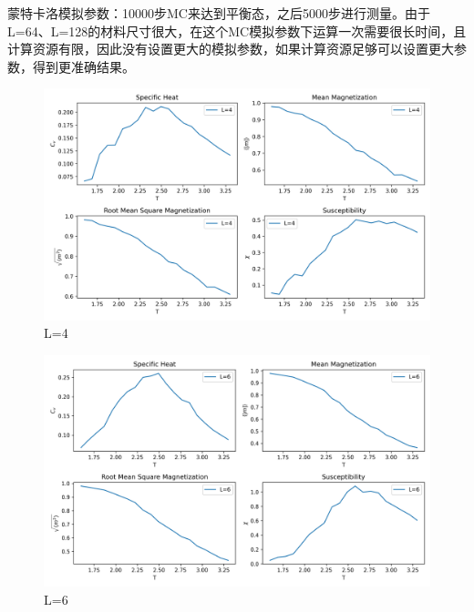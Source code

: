 \documentclass[11pt]{article}
\begin{document}
\begin{question}
{  蒙特卡洛模拟参数：10000步MC来达到平衡态，之后5000步进行测量。由于L=64、L=128的材料尺寸很大，在这个MC模拟参数下运算一次需要很长时间，且计算资源有限，因此没有设置更大的模拟参数，如果计算资源足够可以设置更大参数，得到更准确结果。}
  \begin{figure}[H]
    \centering
    \includegraphics[width=0.7\columnwidth]{ising_model_L4.png}
    \caption{L=4}
  \end{figure}
  \begin{figure}[H]
    \centering
    \includegraphics[width=0.7\columnwidth]{ising_model_L6.png}
    \caption{L=6}
  \end{figure}
  

\end{question}
\end{document}
